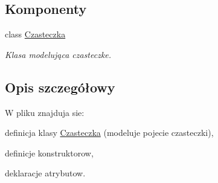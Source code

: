 \subsection*{Komponenty}
\begin{DoxyCompactItemize}
\item 
class \hyperlink{class_czasteczka}{Czasteczka}
\begin{DoxyCompactList}\small\item\em Klasa modelująca czasteczke. \end{DoxyCompactList}\end{DoxyCompactItemize}


\subsection{Opis szczegółowy}
W pliku znajduja sie\+:
\begin{DoxyItemize}
\item definicja klasy \hyperlink{class_czasteczka}{Czasteczka} (modeluje pojecie czasteczki),
\item definicje konstruktorow,
\item deklaracje atrybutow. 
\end{DoxyItemize}